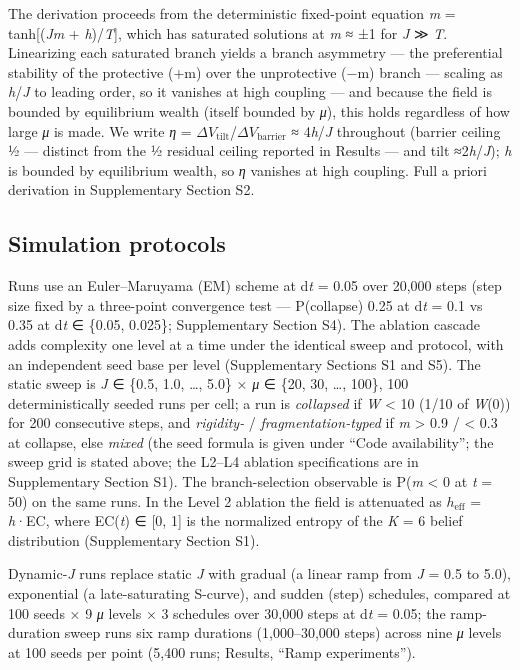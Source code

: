 \documentclass[11pt,letterpaper]{article}
\begin{document}
The derivation proceeds from the deterministic fixed-point equation \emph{m} = tanh{[}(\emph{Jm} + \emph{h})/\emph{T}{]}, which has saturated solutions at \emph{m} ≈ ±1 for \emph{J} ≫ \emph{T}. Linearizing each saturated branch yields a branch asymmetry --- the preferential stability of the protective (+m) over the unprotective (−m) branch --- scaling as \emph{h}/\emph{J} to leading order, so it vanishes at high coupling --- and because the field is bounded by equilibrium wealth (itself bounded by \emph{μ}), this holds regardless of how large \emph{μ} is made. We write \emph{η} = \(\Delta{}V_{\mathrm{tilt}}\)/\(\Delta{}V_{\mathrm{barrier}}\) ≈ 4\emph{h}/\emph{J} throughout (barrier ceiling ½ --- distinct from the ½ residual ceiling reported in Results --- and tilt ≈2\emph{h}/\emph{J}); \emph{h} is bounded by equilibrium wealth, so \emph{η} vanishes at high coupling. Full a priori derivation in Supplementary Section S2.

\subsection{Simulation protocols}\label{simulation-protocols}

Runs use an Euler--Maruyama (EM) scheme at d\emph{t} = 0.05 over 20,000 steps (step size fixed by a three-point convergence test --- P(collapse) 0.25 at d\emph{t} = 0.1 vs 0.35 at d\emph{t} ∈ \{0.05, 0.025\}; Supplementary Section S4). The ablation cascade adds complexity one level at a time under the identical sweep and protocol, with an independent seed base per level (Supplementary Sections S1 and S5). The static sweep is \emph{J} ∈ \{0.5, 1.0, \ldots, 5.0\} × \emph{μ} ∈ \{20, 30, \ldots, 100\}, 100 deterministically seeded runs per cell; a run is \emph{collapsed} if \emph{W} \textless{} 10 (1/10 of \emph{W}(0)) for 200 consecutive steps, and \emph{rigidity-} / \emph{fragmentation-typed} if \textbar{}\emph{m}\textbar{} \textgreater{} 0.9 / \textless{} 0.3 at collapse, else \emph{mixed} (the seed formula is given under ``Code availability''; the sweep grid is stated above; the L2--L4 ablation specifications are in Supplementary Section S1). The branch-selection observable is P(\emph{m} \textless{} 0 at \emph{t} = 50) on the same runs. In the Level 2 ablation the field is attenuated as \(h_{\mathrm{eff}}\) = \emph{h}·EC, where EC(\emph{t}) ∈ {[}0, 1{]} is the normalized entropy of the \emph{K} = 6 belief distribution (Supplementary Section S1).

Dynamic-\emph{J} runs replace static \emph{J} with gradual (a linear ramp from \emph{J} = 0.5 to 5.0), exponential (a late-saturating S-curve), and sudden (step) schedules, compared at 100 seeds × 9 \emph{μ} levels × 3 schedules over 30,000 steps at d\emph{t} = 0.05; the ramp-duration sweep runs six ramp durations (1,000--30,000 steps) across nine \emph{μ} levels at 100 seeds per point (5,400 runs; Results, ``Ramp experiments'').
\end{document}
